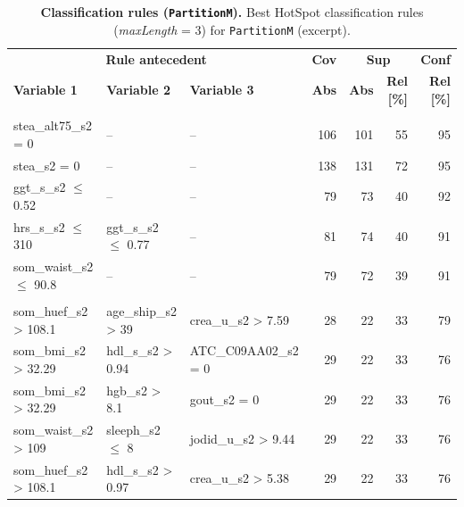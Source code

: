 \documentclass[
  oneside]{book}
\begin{document}
\begin{table}[!h]

\caption{\label{tab:03-rule-list-men}\textbf{Classification rules (\texttt{PartitionM}).} Best HotSpot classification rules (\emph{maxLength} = 3) for \texttt{PartitionM} (excerpt).}
\centering
\begin{tabular}[t]{lllrrrr}
\toprule
\multicolumn{3}{c}{\textbf{Rule antecedent}} & \multicolumn{1}{c}{\textbf{Cov}} & \multicolumn{2}{c}{\textbf{Sup}} & \multicolumn{1}{c}{\textbf{Conf}} \\
\cmidrule(l{3pt}r{3pt}){1-3} \cmidrule(l{3pt}r{3pt}){4-4} \cmidrule(l{3pt}r{3pt}){5-6} \cmidrule(l{3pt}r{3pt}){7-7}
\textbf{Variable 1} & \textbf{Variable 2} & \textbf{Variable 3} & \textbf{Abs} & \textbf{Abs} & \textbf{Rel [\%]} & \textbf{Rel [\%]}\\
\midrule
\addlinespace[0.3em]
\multicolumn{7}{l}{\textbf{Target class: A}}\\
\hspace{1em}stea\_alt75\_s2 = 0 & -- & -- & 106 & 101 & 55 & 95\\
\hspace{1em}stea\_s2 = 0 & -- & -- & 138 & 131 & 72 & 95\\
\hspace{1em}ggt\_s\_s2 $\leq$ 0.52 & -- & -- & 79 & 73 & 40 & 92\\
\hspace{1em}hrs\_s\_s2 $\leq$ 310 & ggt\_s\_s2 $\leq$ 0.77 & -- & 81 & 74 & 40 & 91\\
\hspace{1em}som\_waist\_s2 $\leq$ 90.8 & -- & -- & 79 & 72 & 39 & 91\\
\addlinespace[0.3em]
\multicolumn{7}{l}{\textbf{Target class: B}}\\
\hspace{1em}som\_huef\_s2 > 108.1 & age\_ship\_s2 > 39 & crea\_u\_s2 > 7.59 & 28 & 22 & 33 & 79\\
\hspace{1em}som\_bmi\_s2 > 32.29 & hdl\_s\_s2 > 0.94 & ATC\_C09AA02\_s2 = 0 & 29 & 22 & 33 & 76\\
\hspace{1em}som\_bmi\_s2 > 32.29 & hgb\_s2 > 8.1 & gout\_s2 = 0 & 29 & 22 & 33 & 76\\
\hspace{1em}som\_waist\_s2 > 109 & sleeph\_s2 $\leq$ 8 & jodid\_u\_s2 > 9.44 & 29 & 22 & 33 & 76\\
\hspace{1em}som\_huef\_s2 > 108.1 & hdl\_s\_s2 > 0.97 & crea\_u\_s2 > 5.38 & 29 & 22 & 33 & 76\\

\end{tabular}
\end{table}
\end{document}
